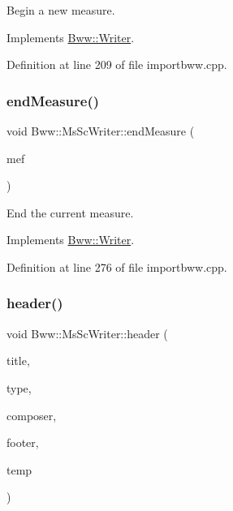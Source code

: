 Begin a new measure. 

Implements \hyperlink{class_bww_1_1_writer}{Bww\+::\+Writer}.



Definition at line 209 of file importbww.\+cpp.

\mbox{\label{class_bww_1_1_ms_sc_writer_aaac2c3a7754b9e4932aed4b67b0c6e95}} 
\subsubsection{\texorpdfstring{end\+Measure()}{endMeasure()}}
{\footnotesize\ttfamily void Bww\+::\+Ms\+Sc\+Writer\+::end\+Measure (\begin{DoxyParamCaption}\item[{const \hyperlink{struct_bww_1_1_measure_end_flags}{Bww\+::\+Measure\+End\+Flags}}]{mef }\end{DoxyParamCaption})\hspace{0.3cm}{\ttfamily [virtual]}}

End the current measure. 

Implements \hyperlink{class_bww_1_1_writer}{Bww\+::\+Writer}.



Definition at line 276 of file importbww.\+cpp.

\mbox{\label{class_bww_1_1_ms_sc_writer_aa10c1014a6f22fd95ded294691b7517c}} 
\subsubsection{\texorpdfstring{header()}{header()}}
{\footnotesize\ttfamily void Bww\+::\+Ms\+Sc\+Writer\+::header (\begin{DoxyParamCaption}\item[{const Q\+String}]{title,  }\item[{const Q\+String}]{type,  }\item[{const Q\+String}]{composer,  }\item[{const Q\+String}]{footer,  }\item[{const unsigned int}]{temp }\end{DoxyParamCaption})\hspace{0.3cm}{\ttfamily [virtual]}}

